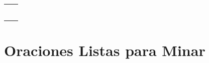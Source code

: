 \documentclass[12pt,a4paper]{article}
\begin{document}
\begin{cajachunk}
\begin{tabularx}{\textwidth}{@{} X l @{}}
\eng{I find this accent easy/hard to understand.} & \esp{Este acento me parece fácil/difícil.} \\
\eng{She speaks with a British/American accent.} & \esp{Habla con acento británico/americano.} \\
\eng{I'm used to American English.} & \esp{Estoy acostumbrado al inglés americano.} \\
\eng{The pronunciation is very different.} & \esp{La pronunciación es muy diferente.} \\
\eng{Can you speak more slowly, please?} & \esp{¿Puedes hablar más despacio?} \\
\eng{I need to hear that again.} & \esp{Necesito escuchar eso de nuevo.} \\
\end{tabularx}
\end{cajachunk}

\section{Oraciones Listas para Minar}
\end{document}
